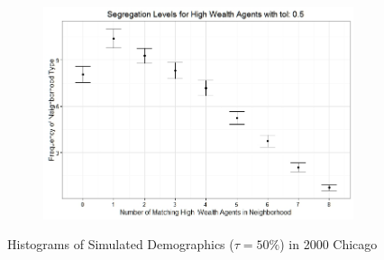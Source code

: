 \begin{figure}[h!]
\begin{subfigure}{.5\textwidth}
\end{subfigure}%
\begin{subfigure}{.5\textwidth}
  \centering
\includegraphics[scale=.35]{figures/2000_5_High.jpeg}
\end{subfigure}
\caption[Simulated Demographics ($\tau = 50\%$); 2000 Chicago]{Histograms of Simulated Demographics ($\tau = 50\%$) in 2000 Chicago}
\end{figure}

